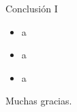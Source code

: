 \documentclass{beamer}
\begin{document}
\begin{frame}{Conclusión I}
	\begin{itemize}
        \item<1-> a
        \item<2-> a
        \item<3-> a
	\end{itemize}
\end{frame}



\begin{frame}{}
	\begin{center}
		\Huge Muchas gracias.
	\end{center}
\end{frame}
\end{document}

